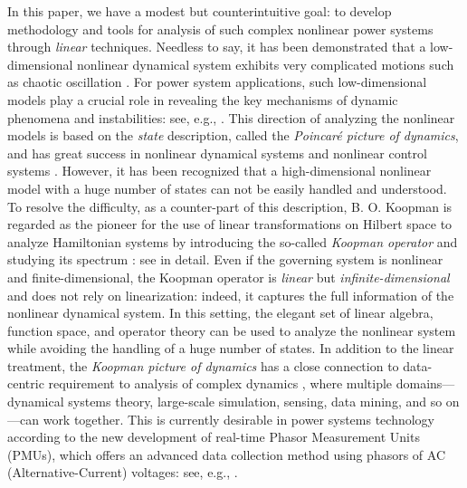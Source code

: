 \documentclass[a4paper,10pt]{article}
\begin{document}
%
In this paper, we have a modest but counterintuitive goal:  to develop methodology and tools for analysis of such complex nonlinear power systems through \emph{linear} techniques.  
Needless to say, it has been demonstrated that a low-dimensional nonlinear dynamical system exhibits very complicated motions such as chaotic oscillation \cite{Ueda_CSF1}.  
For power system applications, such low-dimensional models play a crucial role in revealing  the key mechanisms of dynamic phenomena and instabilities: see, e.g., \cite{Abed_EPES6,Dobson_SCL13,Chiang_IEEETPWRS8,Ueda_IJBC8}.  
This direction of analyzing the nonlinear models is based on the \emph{state} description, called the \emph{Poincar\'e picture of dynamics}, and has great success in nonlinear dynamical systems  \cite{Guckenheimer:1983,Wiggins:1990} and nonlinear control systems \cite{Nijmeijier:1990}.  
However, it has been recognized that a high-dimensional nonlinear model with a huge number of states can not be easily handled and understood.  
To resolve the difficulty, as a counter-part of this description, B. O. Koopman is regarded as the pioneer for the use of linear transformations on Hilbert space to analyze Hamiltonian systems by introducing the so-called \emph{Koopman operator} and studying its spectrum \cite{Koopman_PNAS17}:  see \cite{Peterson_ET,Lasota_CFN} in detail.  
Even if the governing system is nonlinear and finite-dimensional, the Koopman operator is \emph{linear} but \emph{infinite-dimensional} and does not rely on linearization:  indeed, it captures the full information of the nonlinear dynamical system.  
In this setting, the elegant set of linear algebra, function space, and operator theory can be used to analyze the nonlinear system while avoiding the handling of a huge number of states.  
In addition to the linear treatment, the \emph{Koopman picture of dynamics} has a close connection to data-centric requirement to analysis of complex dynamics \cite{Marko_CHAOS22,Mezic_ARFM45}, where multiple domains---dynamical systems theory, large-scale simulation, sensing, data mining, and so on---can work together.  
This is currently desirable in power systems technology according to the new development of real-time Phasor Measurement Units (PMUs), which offers an advanced data collection method using phasors of AC (Alternative-Current) voltages: see, e.g., \cite{Phadke_IEEECAP6,Murphy_IEEECAP35,DeLaRee_IEEETSG1}. 
\end{document}
